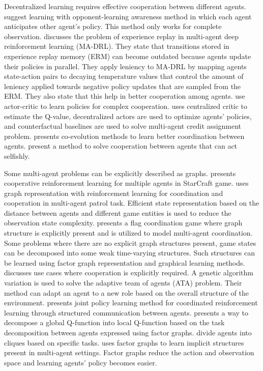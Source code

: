 \documentclass[conference]{IEEEtran}
\begin{document}
Decentralized learning requires effective cooperation between different agents. \cite{Foerster2018aamas} suggest learning with opponent-learning awareness method in which each agent anticipates other agent's policy. This method only works for complete observation. \cite{Palmer2018aamas} discusses the problem of experience replay in multi-agent deep reinforcement learning (MA-DRL). They state that transitions stored in experience replay memory (ERM) can become outdated because agents update their policies in parallel. They apply leniency to MA-DRL by mapping agents state-action pairs to decaying temperature values that control the amount of leniency applied towards negative policy updates that are sampled from the ERM. They also state that this help in better cooperation among agents. \cite{lowe2017multi} use actor-critic to learn policies for complex cooperation. \cite{FoersterFANW17} uses centralized critic to estimate the Q-value, decentralized actors are used to optimize agents' policies, and counterfactual baselines are used to solve multi-agent credit assignment problem. \cite{Yong2001} presents co-evolution methods to learn better coordination between agents. \cite{Pinheiro2018aamas} present a method to solve cooperation between agents that can act selfishly.

Some multi-agent problems can be explicitly described as graphs. \cite{Shao2017} presents cooperative reinforcement learning for multiple agents in StarCraft game. \cite{Hu2010} uses graph representation with reinforcement learning for coordination and cooperation in multi-agent patrol task. Efficient state representation based on the distance between agents and different game entities is used to reduce the observation state complexity. \cite{Marzag2017aamas} presents a flag coordination game where graph structure is explicitly present and is utilized to model multi-agent coordination. Some problems where there are no explicit graph structures present, game states can be decomposed into some weak time-varying structures. Such structures can be learned using factor graph representation and graphical learning methods. \cite{Bryant2018} discusses use cases where cooperation is explicitly required. A genetic algorithm variation is used to solve the adaptive team of agents (ATA) problem. Their method can adapt an agent to a new role based on the overall structure of the environment. \cite{Guestrin2002} presents joint policy learning method for coordinated reinforcement learning through structured communication between agents. \cite{Zhang2014} presents a way to decompose a global Q-function into local Q-function based on the task decomposition between agents expressed using factor graphs. \cite{Zhang2013} divide agents into cliques based on specific tasks. \cite{amato2015} uses factor graphs to learn implicit structures present in multi-agent settings. Factor graphs reduce the action and observation space and learning agents' policy becomes easier.
\end{document}
